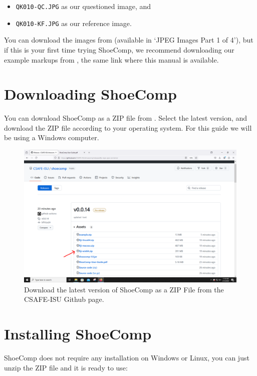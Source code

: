 \documentclass{csafedoc}
\begin{document}
\begin{itemize}
	\item \texttt{QK010-QC.JPG} as our questioned image, and
	\item \texttt{QK010-KF.JPG} as our reference image.
\end{itemize}

You can download the images from 
(available in `JPEG Images Part 1 of 4'), but if this is your first time trying ShoeComp,
we recommend downloading our example markups from
, the same link where this manual is
available.

\section{Downloading ShoeComp}

You can download ShoeComp as a ZIP file from
. Select the latest version, and download
the ZIP file according to your operating system. For this guide we will be using a Windows
computer.

\begin{figure}[htbp]
	\begin{center}
		\includegraphics[width=0.8\linewidth]{images/step_1-anno.png}
	\end{center}
	\caption{Download the latest version of ShoeComp as a ZIP File from the CSAFE-ISU Github page.}
	\label{fig:step1}
\end{figure}

\section{Installing ShoeComp}

ShoeComp does not require any installation on Windows or Linux, you can just unzip the ZIP
file and it is ready to use:
\end{document}
